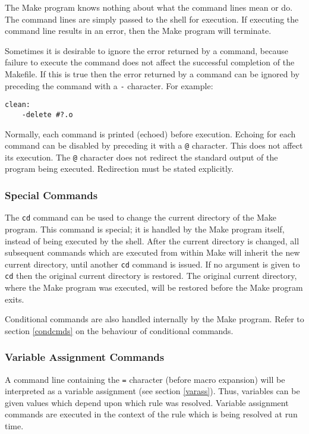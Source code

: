 The Make program knows nothing about what the command lines mean or do.
The command lines are simply passed to the shell for execution.  If
executing the command line results in an error, then the Make program will
terminate.

Sometimes it is desirable to ignore the error returned by a command,
because failure to execute the command does not affect the successful
completion of the Makefile.  If this is true then the error returned by a
command can be ignored by preceding the command with a {\tt -} character.
For example:

\begin{verbatim}
clean:
    -delete #?.o
\end{verbatim}

Normally, each command is printed (echoed) before execution.  Echoing for
each command can be disabled by preceding it with a {\tt @} character.  This
does not affect its execution.  The {\tt @} character does not redirect the
standard output of the program being executed.  Redirection must be stated
explicitly.

\subsubsection{Special Commands}

The {\tt cd} command can be used to change the current directory of the
Make program.  This command is special; it is handled by the Make program
itself, instead of being executed by the shell.  After the current
directory is changed, all subsequent commands which are executed from
within Make will inherit the new current directory, until another {\tt cd}
command is issued.  If no argument is given to {\tt cd} then the original
current directory is restored.  The original current directory, where the
Make program was executed, will be restored before the Make program exits.

Conditional commands are also handled internally by the Make program.
Refer to section \ref{condcmds} on the behaviour of conditional
commands.

\subsubsection{Variable Assignment Commands}

A command line containing the {\tt =} character (before macro expansion)
will be interpreted as a variable assignment (see section \ref{varass}).
Thus, variables can be given values which depend upon which rule was
resolved.  Variable assignment commands are executed in the context of the
rule which is being resolved at run time.


